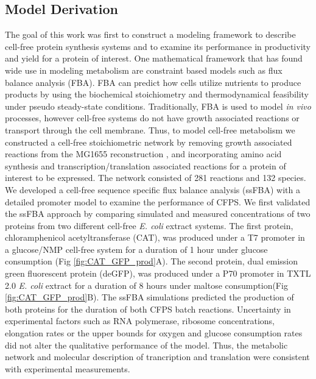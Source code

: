 \documentclass[journal=asbcd6,manuscript=article]{achemso}
\begin{document}
\subsection{Model Derivation}
The goal of this work was first to construct a modeling framework to describe cell-free protein synthesis systems and to examine its performance in productivity and yield for a protein of interest.
One mathematical framework that has found wide use in modeling metabolism are constraint based models such as flux balance analysis (FBA).
FBA can predict how cells utilize nutrients to produce products by using the biochemical stoichiometry and thermodynamical feasibility under pseudo steady-state conditions.
Traditionally, FBA is used to model \textit{in vivo} processes, however cell-free systems do not have growth associated reactions or transport through the cell membrane.
Thus, to model cell-free metabolism we constructed a cell-free stoichiometric network by removing growth associated reactions from the MG1655 reconstruction \cite{Feist:2007aa}, and incorporating amino acid synthesis and transcription/translation associated reactions \cite{Allen:2003aa} for a protein of interest to be expressed. 
The network consisted of 281 reactions and 132 species. 
We developed a cell-free sequence specific flux balance analysis (ssFBA) with a detailed promoter model \cite{Moon:2012aa} to examine the performance of CFPS. 
We first validated the ssFBA approach by comparing simulated and measured concentrations of two proteins from two different cell-free \textit{E. coli} extract systems.
The first protein, chloramphenicol acetyltransferase (CAT), was produced under a T7 promoter in a glucose/NMP cell-free system \cite{2005_calhoun_BiotechnologyProgress} for a duration of 1 hour under glucose consumption (Fig \ref{fig:CAT_GFP_prod}A).
The second protein, dual emission green fluorescent protein (deGFP), was produced under a P70 promoter in TXTL 2.0 \textit{E. coli} extract for a duration of 8 hours under maltose consumption(Fig \ref{fig:CAT_GFP_prod}B).
The ssFBA simulations predicted the production of both proteins for the duration of both CFPS batch reactions.
Uncertainty in experimental factors such as RNA polymerase, ribosome concentrations, elongation rates or the upper bounds for oxygen and glucose consumption rates did not alter the qualitative performance of the model. 
Thus, the metabolic network and molecular description of trancription and translation were consistent with experimental measurements.
\end{document}
